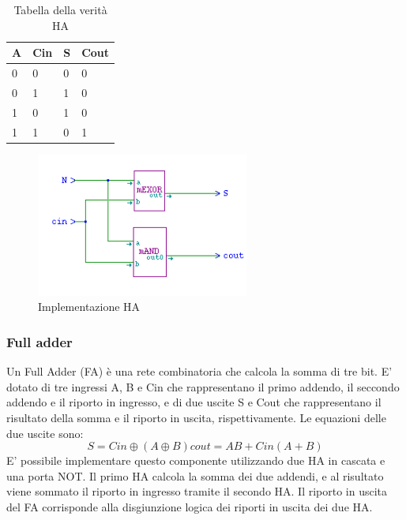 \documentclass[10pt]{article}
\begin{document}
\begin{itemize}
\begin{table}[H]
    \begin{minipage}[b]{0.4\textwidth}
    \centering
    \begin{tabular}{|l|l|l|l|}
        \hline
        \textbf{A} & \textbf{Cin} & \textbf{S} & \textbf{Cout} \\ \hline
        0          & 0            & 0          & 0             \\ 
        0          & 1            & 1          & 0             \\ 
        1          & 0            & 1          & 0             \\ 
        1          & 1            & 0          & 1             \\ \hline
        \end{tabular}
        \caption{Tabella della verità HA}
        \label{table:student}
    \end{minipage}
    \end{table}
    
    \begin{figure}[H]
    \begin{minipage}[b]{0.4\textwidth}
    \centering
    \includegraphics[width=70mm]{ha}
    \caption{Implementazione HA}
    \label{ }
    \end{minipage}
    \end{figure}

\subsubsection{Full adder}
Un Full Adder (FA) è una rete combinatoria che calcola la somma di tre bit. E' dotato di tre ingressi A, B e Cin che rappresentano il primo addendo, il seccondo addendo e il riporto
in ingresso, e di due uscite S e Cout che rappresentano il risultato della somma e il riporto in uscita, rispettivamente. 
Le equazioni delle due uscite sono:
$$
S = Cin \oplus (A \oplus B)
cout = AB + Cin(A + B)
$$
E' possibile implementare questo componente utilizzando due HA in cascata e una porta NOT. Il primo HA calcola la somma dei due addendi, e al risultato viene sommato il riporto in ingresso
tramite il secondo HA.
Il riporto in uscita del FA corrisponde alla disgiunzione logica dei riporti in uscita dei due HA.


\end{itemize}
\end{document}
